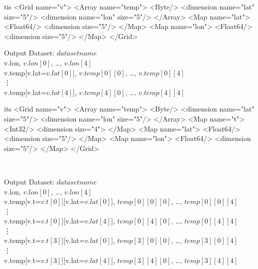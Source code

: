\documentclass[justify]{dods-paper}
\begin{document}
\begin{enumerate}
\begin{minipage}[t]{2.5in}
\begin{vcode}{tis}
<Grid name="v">
  <Array name="temp">
    <Byte/>
    <dimension name="lat" size="5"/>
    <dimension name="lon" size="5"/>
  </Array>
  <Map name="lat">
    <Float64/>
    <dimension size="5"/>
  </Map>
  <Map name="lon">
    <Float64/>
    <dimension size="5"/>
  </Map>
</Grid>
\end{vcode}
\end{minipage}
\begin{minipage}[t]{5in}
\begin{textoutput}{Output}
Dataset: $dataset name$\\
v.lon, $v.lon[0]$, \ldots, $v.lon[4]$\\
v.temp[v.lat=$v.lat[0]$], $v.temp[0][0]$, \ldots, $v.temp[0][4]$\\
\vdots\\
v.temp[v.lat=$v.lat[4]$], $v.temp[4][0]$, \ldots, $v.temp[4][4]$
\end{textoutput}
\end{minipage}

\begin{minipage}[t]{2.5in}

\begin{vcode}{its}
<Grid name="v">
  <Array name="temp">
    <Byte/>
    <dimension name="lat" size="5"/>
    <dimension name="lon" size="5"/>
  </Array>
  <Map name="t">
    <Int32/>
    <dimension size="4">
  </Map>
  <Map name="lat">
    <Float64/>
    <dimension size="5"/>
  </Map>
  <Map name="lon">
    <Float64/>
    <dimension size="5"/>
  </Map>
</Grid>
\end{vcode}
\end{minipage}
\\
\begin{minipage}[t]{5in}
\begin{textoutput}{Output}
Dataset: $dataset name$\\
v.lon, $v.lon[0]$, \ldots, $v.lon[4]$\\
v.temp[v.t=$v.t[0]$][v.lat=$v.lat[0]$], $temp[0][0][0]$, \ldots, $temp[0][0][4]$\\
\vdots\\
v.temp[v.t=$v.t[0]$][v.lat=$v.lat[4]$], $temp[0][4][0]$, \ldots, $temp[0][4][4]$\\
\vdots\\
v.temp[v.t=$v.t[3]$][v.lat=$v.lat[0]$], $temp[3][0][0]$, \ldots, $temp[3][0][4]$\\
\vdots\\
v.temp[v.t=$v.t[3]$][v.lat=$v.lat[4]$], $temp[3][4][0]$, \ldots, $temp[3][4][4]$\\
\end{textoutput}
\end{minipage}

\end{enumerate}
\end{document}
